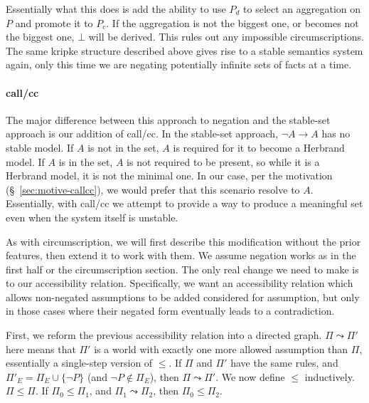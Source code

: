 Essentially what this does is add the ability to use $P_d$ to select an aggregation on $P$ and promote it to $P_c$.
If the aggregation is not the biggest one, or becomes not the biggest one, $\bot$ will be derived.
This rules out any impossible circumscriptions.
The same kripke structure described above gives rise to a stable semantics system again, only this time we are negating potentially infinite sets of facts at a time.
\paragraph{call/cc}
The major difference between this approach to negation and the stable-set approach is our addition of call/cc.
In the stable-set approach, $\neg A \rightarrow A$ has no stable model.
If $A$ is not in the set, $A$ is required for it to become a Herbrand model.
If $A$ is in the set, $A$ is not required to be present, so while it is a Herbrand model, it is not the minimal one.
In our case, per the motivation (\S~\ref{sec:motive-callcc}), we would prefer that this scenario resolve to $A$.
Essentially, with call/cc we attempt to provide a way to produce a meaningful set even when the system itself is unstable.

As with circumscription, we will first describe this modification without the prior features, then extend it to work with them.
We assume negation works as in the first half or the circumscription section.
The only real change we need to make is to our accessibility relation.
Specifically, we want an accessibility relation which allows non-negated assumptions to be added considered for assumption, but only in those cases where their negated form eventually leads to a contradiction.

First, we reform the previous accessibility relation into a directed graph.
$\Pi \leadsto \Pi'$ here means that $\Pi'$ is a world with exactly one more allowed assumption than $\Pi$, essentially a single-step version of $\leq$.
If $\Pi$ and $\Pi'$ have the same rules, and $\Pi'_E = \Pi_E \cup \{\neg P\}$ (and $\neg P \not \in \Pi_E$), then $\Pi \leadsto \Pi'$.
We now define $\leq$ inductively.
$\Pi \leq \Pi$.
If $\Pi_0 \leq \Pi_1$, and $\Pi_1 \leadsto \Pi_2$, then $\Pi_0 \leq \Pi_2$.

